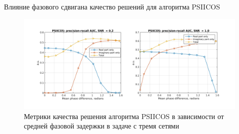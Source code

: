 \documentclass[12pt]{beamer}
\begin{document}
\begin{frame}[t]{Влияние фазового сдвига}{на качество решений для алгоритма PSIICOS}
    
    \begin{figure}[!ht]
     \includegraphics[width=1\textwidth]{../images/psiicos_paper/Figure9_hr.jpg}
     {\tiny Метрики качества решения алгоритма PSIICOS в зависимости от средней фазовой задержки в задаче
     с тремя сетями}
    \end{figure}%
\end{frame}
\end{document}

